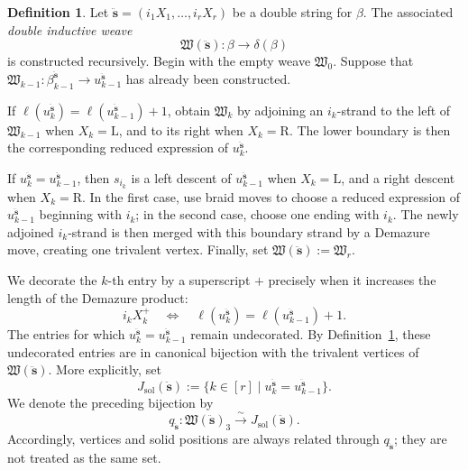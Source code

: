 \documentclass[12pt, reqno]{amsart}
\theoremstyle{plain}
\theoremstyle{definition}
\newtheorem{definition}[theorem]{Definition}
\numberwithin{equation}{section}
\begin{document}
\begin{definition}\label{def:double-inductive-weave}
    Let \(\ddot{\mathbf{s}}=(i_1X_1,\ldots,i_rX_r)\) be a double string for
    \(\beta\). The associated \emph{double inductive weave}
    \begin{equation*}
        \mathfrak W(\ddot{\mathbf{s}})\colon
        \beta\longrightarrow\delta(\beta)
    \end{equation*}
    is constructed recursively. Begin with the empty weave
    \(\mathfrak W_0\). Suppose that
    \(\mathfrak W_{k-1}\colon\beta^{\ddot{\mathbf{s}}}_{k-1}\to u^{\ddot{\mathbf{s}}}_{k-1}\) has already
    been constructed.

    If \(\ell(u^{\ddot{\mathbf{s}}}_k)=\ell(u^{\ddot{\mathbf{s}}}_{k-1})+1\), obtain \(\mathfrak W_k\) by
    adjoining an \(i_k\)-strand to the left of \(\mathfrak W_{k-1}\)
    when \(X_k=\mathrm L\), and to its right when
    \(X_k=\mathrm R\). The lower boundary is then the corresponding
    reduced expression of \(u^{\ddot{\mathbf{s}}}_k\).

    If \(u^{\ddot{\mathbf{s}}}_k=u^{\ddot{\mathbf{s}}}_{k-1}\), then \(s_{i_k}\) is a left descent of
    \(u^{\ddot{\mathbf{s}}}_{k-1}\) when \(X_k=\mathrm L\), and a right descent when
    \(X_k=\mathrm R\). In the first case, use braid moves to choose a
    reduced expression of \(u^{\ddot{\mathbf{s}}}_{k-1}\) beginning with \(i_k\); in the
    second case, choose one ending with \(i_k\). The newly adjoined
    \(i_k\)-strand is then merged with this boundary strand by a
    Demazure move, creating one trivalent vertex. Finally, set
    \(\mathfrak W(\ddot{\mathbf{s}}):=\mathfrak W_r\).
\end{definition}

We decorate the \(k\)-th entry by a superscript \(+\) precisely when
it increases the length of the Demazure product:
\begin{equation}\label{eq:decorated-double-string}
    i_kX_k^+
    \quad\Longleftrightarrow\quad
    \ell(u^{\ddot{\mathbf{s}}}_k)=\ell(u^{\ddot{\mathbf{s}}}_{k-1})+1.
\end{equation}
The entries for which \(u^{\ddot{\mathbf{s}}}_k=u^{\ddot{\mathbf{s}}}_{k-1}\) remain undecorated. By
Definition~\ref{def:double-inductive-weave}, these undecorated entries
are in canonical bijection with the trivalent vertices of
\(\mathfrak W(\ddot{\mathbf{s}})\).
More explicitly, set
\[
    J_{\mathrm{sol}}(\ddot{\mathbf s})
    :=\{k\in[r]\mid
          u_k^{\ddot{\mathbf s}}=u_{k-1}^{\ddot{\mathbf s}}\}.
\]
We denote the preceding bijection by
\begin{equation}\label{eq:trivalent-solid-position-bijection}
    q_{\ddot{\mathbf s}}\colon
    \mathfrak W(\ddot{\mathbf s})_3
    \xrightarrow{\sim}
    J_{\mathrm{sol}}(\ddot{\mathbf s}).
\end{equation}
Accordingly, vertices and solid positions are always related through
\(q_{\ddot{\mathbf s}}\); they are not treated as the same set.
\end{document}
